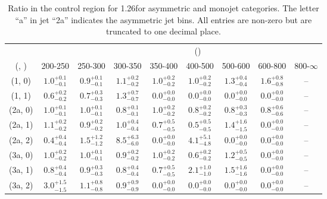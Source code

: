 \begin{table}[h!]
\tiny
\centering
\caption{Ratio in the \mmj control region for 1.26\ifb for asymmetric and monojet categories. The letter ``a'' in jet \eg ``2a''  indicates the asymmetric jet bins. All entries are non-zero but are truncated to one decimal place.\label{tab:ratiosep_ewk_mumu_asym}}
\begin{tabular}
{ccccccccc}
	\hline\hline
&	& \multicolumn{8}{c}{\scalht (\gev)} \\ 
	 (\njet,  \nb) & 200-250 & 250-300 & 300-350 & 350-400 & 400-500 & 500-600 & 600-800 & 800-$\infty$ \\ [0.8ex] 
\hline
	(1, 0) & $1.0^{+ 0.1 }_{- 0.1 }$ & $0.9^{+ 0.1 }_{- 0.1 }$ & $1.1^{+ 0.2 }_{- 0.2 }$ & $1.0^{+ 0.2 }_{- 0.2 }$ & $1.0^{+ 0.2 }_{- 0.2 }$ & $1.3^{+ 0.4 }_{- 0.4 }$ & $1.6^{+ 0.8 }_{- 0.8 }$ & -- \\[0.5ex] 
	(1, 1) & $0.6^{+ 0.2 }_{- 0.2 }$ & $0.7^{+ 0.3 }_{- 0.3 }$ & $1.3^{+ 0.7 }_{- 0.7 }$ & $0.0^{+ 0.0 }_{- 0.0 }$ & $0.0^{+ 0.0 }_{- 0.0 }$ & $0.0^{+ 0.0 }_{- 0.0 }$ & $0.0^{+ 0.0 }_{- 0.0 }$ & -- \\[0.5ex] 
	(2a, 0) & $1.0^{+ 0.1 }_{- 0.1 }$ & $1.0^{+ 0.1 }_{- 0.1 }$ & $0.8^{+ 0.1 }_{- 0.1 }$ & $1.0^{+ 0.2 }_{- 0.2 }$ & $0.8^{+ 0.2 }_{- 0.2 }$ & $0.8^{+ 0.3 }_{- 0.3 }$ & $0.8^{+ 0.6 }_{- 0.6 }$ & -- \\[0.5ex] 
	(2a, 1) & $1.1^{+ 0.2 }_{- 0.2 }$ & $0.9^{+ 0.2 }_{- 0.2 }$ & $1.0^{+ 0.4 }_{- 0.4 }$ & $0.7^{+ 0.5 }_{- 0.5 }$ & $0.5^{+ 0.5 }_{- 0.5 }$ & $1.4^{+ 1.6 }_{- 1.5 }$ & $0.0^{+ 0.0 }_{- 0.0 }$ & -- \\[0.5ex] 
	(2a, 2) & $0.4^{+ 0.4 }_{- 0.4 }$ & $1.5^{+ 1.2 }_{- 1.2 }$ & $8.5^{+ 6.3 }_{- 6.0 }$ & $0.0^{+ 0.0 }_{- 0.0 }$ & $4.1^{+ 5.1 }_{- 4.8 }$ & $0.0^{+ 0.0 }_{- 0.0 }$ & $0.0^{+ 0.0 }_{- 0.0 }$ & -- \\[0.5ex] 
	(3a, 0) & $1.0^{+ 0.2 }_{- 0.2 }$ & $1.0^{+ 0.1 }_{- 0.1 }$ & $0.9^{+ 0.2 }_{- 0.2 }$ & $1.0^{+ 0.2 }_{- 0.2 }$ & $0.6^{+ 0.2 }_{- 0.2 }$ & $1.2^{+ 0.5 }_{- 0.5 }$ & $0.0^{+ 0.0 }_{- 0.0 }$ & -- \\[0.5ex] 
	(3a, 1) & $0.8^{+ 0.4 }_{- 0.4 }$ & $0.9^{+ 0.3 }_{- 0.3 }$ & $0.8^{+ 0.4 }_{- 0.4 }$ & $0.7^{+ 0.5 }_{- 0.5 }$ & $2.1^{+ 1.0 }_{- 1.0 }$ & $1.5^{+ 1.6 }_{- 1.6 }$ & $0.0^{+ 0.0 }_{- 0.0 }$ & -- \\[0.5ex] 
	(3a, 2) & $3.0^{+ 1.5 }_{- 1.5 }$ & $1.1^{+ 0.8 }_{- 0.8 }$ & $0.9^{+ 0.9 }_{- 0.9 }$ & $0.0^{+ 0.0 }_{- 0.0 }$ & $0.0^{+ 0.0 }_{- 0.0 }$ & $0.0^{+ 0.0 }_{- 0.0 }$ & $0.0^{+ 0.0 }_{- 0.0 }$ & -- \\[0.5ex] 

\end{tabular}
\end{table}
